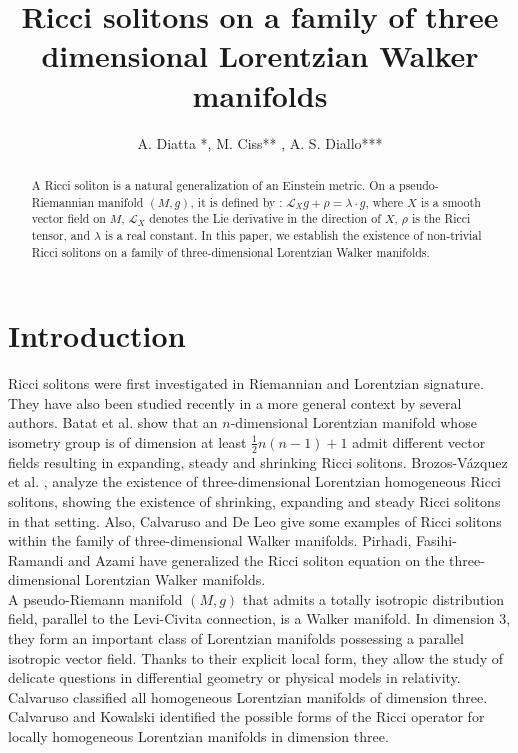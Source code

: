 \documentclass[reqno, 12pt]{amsart}
\title[Ricci solitons on a family of  three dimensional Lorentzian Walker manifolds]{Ricci solitons on a family of  three dimensional Lorentzian Walker manifolds}
\author{A. Diatta *,  M. Ciss** , A. S. Diallo***}
\numberwithin{equation}{section}
\begin{document}
 
\begin{abstract}  
A Ricci soliton is a natural generalization of an Einstein metric. On a 
pseudo-Riemannian manifold $(M, g)$, it is defined by  :
$\mathcal{L}_X g + \rho = \lambda \cdot g$, where $X$ is a smooth vector field
on $M$, $\mathcal{L}_{X}$ denotes the Lie derivative in the direction of $X$, 
$\rho$ is the Ricci tensor, and $\lambda$ is a real constant. In this paper, 
we establish the existence of non-trivial Ricci solitons on a family of 
three-dimensional Lorentzian Walker manifolds.
\end{abstract}

\maketitle

\section{Introduction} 



\noindent
Ricci solitons were first investigated in Riemannian and Lorentzian signature.
They have also been studied recently in a more general context by several 
authors.  Batat et al. \cite{Batat2011} show that an $n$-dimensional
Lorentzian manifold whose isometry group is of dimension at least 
$\frac{1}{2} n(n-1)+1$ admit different vector fields resulting in expanding, 
steady and shrinking Ricci solitons. Brozos-V\'azquez et al. \cite{Brozos2012}, 
analyze the existence of three-dimensional Lorentzian homogeneous Ricci 
solitons, showing the existence of shrinking, expanding and steady Ricci 
solitons in that setting.  Also, Calvaruso and De Leo \cite{CalvarusoDeLeo2011} 
give some examples of Ricci solitons within the family of three-dimensional 
Walker manifolds. Pirhadi, Fasihi-Ramandi and Azami \cite{PirhadiFasihiRamandiAzami2023} 
have generalized the Ricci soliton equation on the three-dimensional 
Lorentzian Walker manifolds.\\ 


A pseudo-Riemann manifold $(M, g)$ that admits a totally isotropic distribution 
field, parallel to the Levi-Civita connection, is a Walker manifold.  In dimension $3$, 
they form an important class of Lorentzian manifolds possessing a parallel isotropic vector field. Thanks to their explicit local form, they allow the study of delicate 
questions in differential geometry or physical models in relativity. 
Calvaruso \cite{Calvaruso2007} classified all homogeneous Lorentzian manifolds of dimension three. Calvaruso and Kowalski \cite{CalvarusoKowalki2009} identified 
the possible forms of the Ricci operator for locally homogeneous Lorentzian 
manifolds in dimension three.\\
\end{document}
